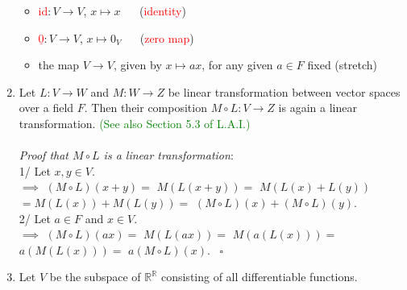 \documentclass[
  12pt,
  a4paper,
  twoside]{article}
\providecommand{\tightlist}{%
  \setlength{\itemsep}{0pt}\setlength{\parskip}{0pt}}
\theoremstyle{plain}
\theoremstyle{definition}
\begin{document}
\begin{enumerate}
  \begin{itemize}
  \tightlist
  \item
    \textcolor{red}{id}\(: V \to V\), \(x \mapsto x\) ~~ (\textcolor{red}{identity})
  \item
    \textcolor{red}{$\underline{0}$}\(:V \to V\), \(x \mapsto 0_{V}\) ~~ (\textcolor{red}{zero map})
  \item
    the map \(V \to V\), given by \(x \mapsto ax\), for any given \(a\in F\) fixed (stretch)
  \end{itemize}
\item
  Let \(L: V \to W\) and \(M: W \to Z\) be linear transformation between vector spaces over a field \(F\).
  Then their composition \(M \circ L: V \to Z\) is again a linear transformation. \textcolor{green}{(See also Section 5.3 of L.A.I.)}\\
  \hspace*{0.333em}\\
  \emph{Proof that \(M\circ L\) is a linear transformation}:\\
  1/ Let \(x,y \in V\).\\
  \hspace*{0.333em}\hspace*{0.333em}\hspace*{0.333em}\(\implies\) \((M \circ L)(x+y) =\) \(M(L(x+y)) =\) \(M(L(x) + L(y))\)\\
  \hspace*{0.333em}\hspace*{0.333em}\hspace*{0.333em}\hspace*{0.333em}\hspace*{0.333em}\hspace*{0.333em}\hspace*{0.333em}\hspace*{0.333em}\hspace*{0.333em}\hspace*{0.333em}\(= M(L(x)) + M(L(y)) =\) \((M \circ L)(x) + (M \circ L)(y)\).\\
  2/ Let \(a\in F\) and \(x \in V\).\\
  \hspace*{0.333em}\hspace*{0.333em}\hspace*{0.333em}\(\implies\) \((M \circ L)(ax) =\) \(M(L(ax)) =\) \(M(a(L(x))) =\) \(a(M(L(x))) =\) \(a(M \circ L)(x)\).
  \hfill~{\(\square\)}
\item
  Let \(V\) be the subspace of \(\mathbb{R}^{\mathbb{R}}\) consisting of all differentiable functions.

\end{enumerate}
\end{document}
